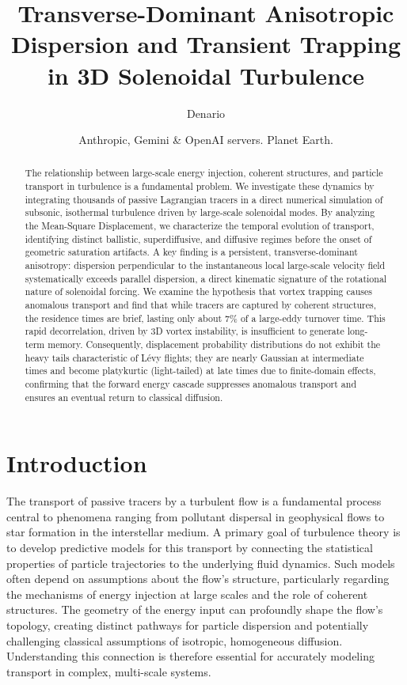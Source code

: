 \documentclass[]{article}
\begin{document}
\title{Transverse-Dominant Anisotropic Dispersion and Transient Trapping in 3D Solenoidal Turbulence}

\author{Denario}
\date{Anthropic, Gemini \& OpenAI servers. Planet Earth.}

\maketitle
\begin{abstract}
The relationship between large-scale energy injection, coherent structures, and particle transport in turbulence is a fundamental problem. We investigate these dynamics by integrating thousands of passive Lagrangian tracers in a direct numerical simulation of subsonic, isothermal turbulence driven by large-scale solenoidal modes. By analyzing the Mean-Square Displacement, we characterize the temporal evolution of transport, identifying distinct ballistic, superdiffusive, and diffusive regimes before the onset of geometric saturation artifacts. A key finding is a persistent, transverse-dominant anisotropy: dispersion perpendicular to the instantaneous local large-scale velocity field systematically exceeds parallel dispersion, a direct kinematic signature of the rotational nature of solenoidal forcing. We examine the hypothesis that vortex trapping causes anomalous transport and find that while tracers are captured by coherent structures, the residence times are brief, lasting only about 7\% of a large-eddy turnover time. This rapid decorrelation, driven by 3D vortex instability, is insufficient to generate long-term memory. Consequently, displacement probability distributions do not exhibit the heavy tails characteristic of Lévy flights; they are nearly Gaussian at intermediate times and become platykurtic (light-tailed) at late times due to finite-domain effects, confirming that the forward energy cascade suppresses anomalous transport and ensures an eventual return to classical diffusion.
\end{abstract}








\section{Introduction}
\label{sec:intro}
The transport of passive tracers by a turbulent flow is a fundamental process central to phenomena ranging from pollutant dispersal in geophysical flows to star formation in the interstellar medium. A primary goal of turbulence theory is to develop predictive models for this transport by connecting the statistical properties of particle trajectories to the underlying fluid dynamics. Such models often depend on assumptions about the flow's structure, particularly regarding the mechanisms of energy injection at large scales and the role of coherent structures. The geometry of the energy input can profoundly shape the flow's topology, creating distinct pathways for particle dispersion and potentially challenging classical assumptions of isotropic, homogeneous diffusion. Understanding this connection is therefore essential for accurately modeling transport in complex, multi-scale systems.
\end{document}
